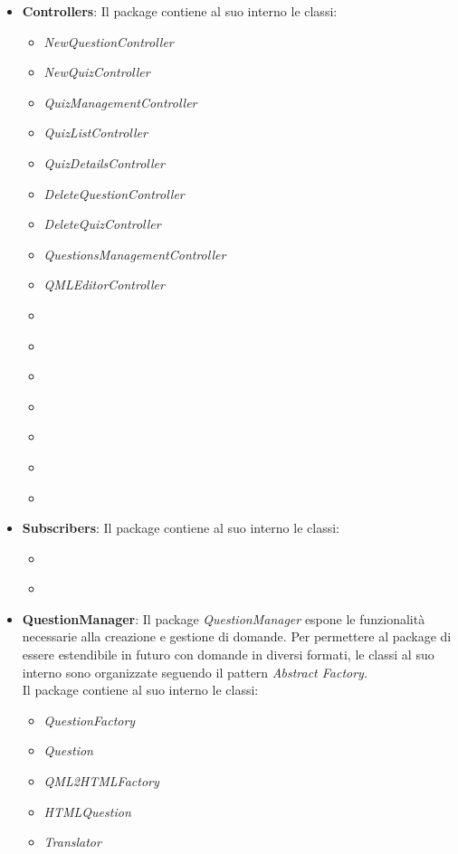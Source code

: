 	\begin{itemize}
	\item \textbf{Controllers}:
	Il package contiene al suo interno le classi:
	\begin{itemize}
		\item \textit{NewQuestionController}
		\item \textit{NewQuizController}
		\item \textit{QuizManagementController}
		\item \textit{QuizListController}
		\item \textit{QuizDetailsController}
		\item \textit{DeleteQuestionController}
		\item \textit{DeleteQuizController}
		\item \textit{QuestionsManagementController}
		\item \textit{QMLEditorController}
		\item \textit{}
		\item \textit{}
		\item \textit{}
		\item \textit{}
		\item \textit{}
		\item \textit{}
		\item \textit{}
	\end{itemize}	
	\item \textbf{Subscribers}:
	Il package contiene al suo interno le classi:
	\begin{itemize}
		\item \textit{}
		\item \textit{}
	\end{itemize}
	
	\item \textbf{QuestionManager}:
	Il package \emph{QuestionManager} espone le funzionalità necessarie alla creazione e gestione di domande. Per permettere al package di essere estendibile in futuro con domande in diversi formati, le classi al suo interno sono organizzate seguendo il pattern \emph{Abstract Factory}. \\
	Il package contiene al suo interno le classi:
	\begin{itemize}
		\item \textit{QuestionFactory}
		\item \textit{Question}
		\item \textit{QML2HTMLFactory}
		\item \textit{HTMLQuestion}
		\item \textit{Translator}
	\end{itemize}
	

\end{itemize}
